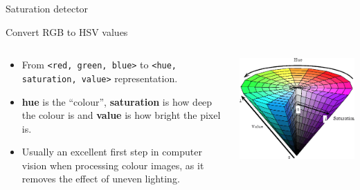 \documentclass[compress]{beamer}
\begin{document}
\begin{frame}[fragile]{Saturation detector}

Convert RGB to HSV values

    \begin{columns}
        \begin{column}{0.5\linewidth}
\begin{itemize}

    \item From \texttt{<red, green, blue>} to \texttt{<hue, saturation, value>} representation.
\item \textbf{hue} is the ``colour'', \textbf{saturation} is how deep the
  colour is and \textbf{value} is how bright the pixel is.
\item Usually an excellent first step in computer vision when processing
  colour images, as it removes the effect of uneven lighting.
\end{itemize}
            
        \end{column}
        \begin{column}{0.5\linewidth}

    \begin{center}
        \includegraphics[width=\columnwidth]{hsv}
    \end{center}

        \end{column}
    \end{columns}


\end{frame}
\end{document}
